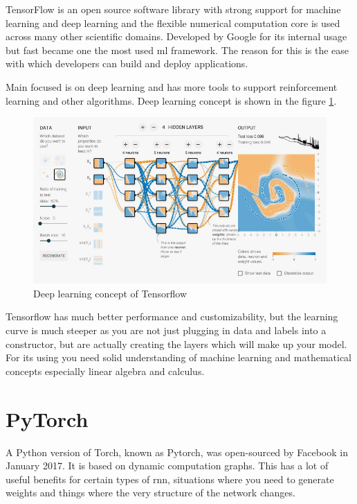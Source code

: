 \documentclass[thesis=M,english]{FITthesis}[2012/06/26]
\begin{document}
TensorFlow\cite{ml_tensorflow} is an open source software library with strong support for machine learning and deep learning and the flexible numerical computation core is used across many other scientific domains. Developed by Google for its internal usage but fast became one the most used \acrshort{ml} framework. The reason for this is the ease with which developers can build and deploy applications.

Main focused is on deep learning and has more tools to support reinforcement learning and other algorithms. Deep learning concept is shown in the figure \ref{fig:ml_tensorflow_dl}.

\begin{figure}[h!]\centering
	\includegraphics[width=1\textwidth]{pictures/ml_tensorflow_dl}
	\caption{Deep learning concept of Tensorflow \cite{ml_tensorflow_dl}}\label{fig:ml_tensorflow_dl}
\end{figure}

Tensorflow has much better performance and customizability, but the learning curve is much steeper as you are not just plugging in data and labels into a constructor, but are actually creating the layers which will make up your model. For its using you need solid understanding of machine learning and mathematical concepts especially linear algebra and calculus.
\pagebreak

\section{PyTorch}

A Python version of Torch, known as Pytorch, was open-sourced by Facebook in January 2017. It is based on dynamic computation graphs. This has a lot of useful benefits for certain types of \acrshort{rnn}, situations where you need to generate weights and things where the very structure of the network changes.\\
\end{document}
